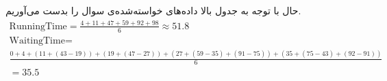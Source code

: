 حال با توجه به جدول بالا داده‌های خواسته‌شده‌ی سوال را بدست می‌آوریم.
\begin{gather*}
    \text{RunningTime} = \frac{4 + 11 + 47 + 59 + 92 + 98}{6} \approx 51.8\\
    \text{WaitingTime} = \\
    \frac{0 + 4 + (11 + (43 - 19)) + (19 + (47 - 27)) + (27 + (59 - 35) + (91 - 75)) + (35 + (75 - 43) + (92 - 91))}{6}
    \\= 35.5 
\end{gather*}